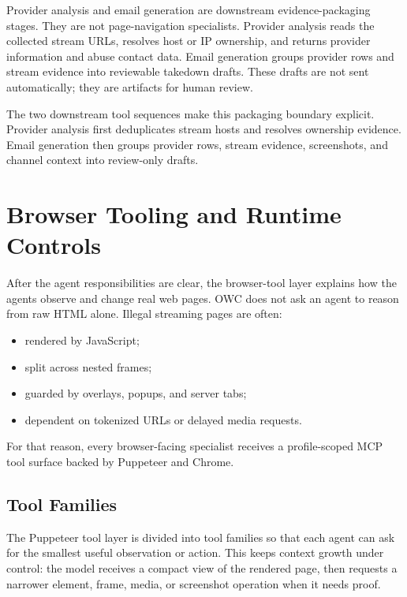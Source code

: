 Provider analysis and email generation are downstream evidence-packaging stages.
They are not page-navigation specialists. Provider analysis reads the collected
stream URLs, resolves host or IP ownership, and returns provider information and
abuse contact data. Email generation groups provider rows and stream evidence
into reviewable takedown drafts. These drafts are not sent automatically; they
are artifacts for human review.



The two downstream tool sequences make this packaging boundary explicit. Provider
analysis first deduplicates stream hosts and resolves ownership evidence. Email
generation then groups provider rows, stream evidence, screenshots, and channel
context into review-only drafts.



\FloatBarrier
\clearpage

\FloatBarrier

\section{Browser Tooling and Runtime Controls}

After the agent responsibilities are clear, the browser-tool layer explains how the
agents observe and change real web pages. OWC does not ask an agent to reason from raw
HTML alone. Illegal streaming pages are often:
\begin{itemize}
  \item rendered by JavaScript;
  \item split across nested frames;
  \item guarded by overlays, popups, and server tabs;
  \item dependent on tokenized URLs or delayed media requests.
\end{itemize}

For that reason, every browser-facing specialist receives a profile-scoped MCP tool
surface backed by Puppeteer and Chrome.



\subsection{Tool Families}

The Puppeteer tool layer is divided into tool families so that each agent can ask for
the smallest useful observation or action. This keeps context growth under control:
the model receives a compact view of the rendered page, then requests a narrower
element, frame, media, or screenshot operation when it needs proof.

